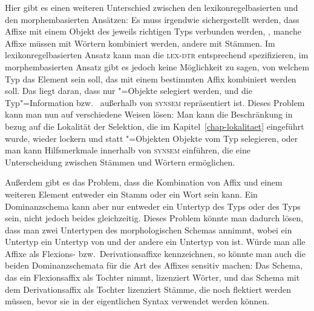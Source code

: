 Hier gibt es einen weiteren Unterschied zwischen den lexikonregelbasierten und den morphembasierten Ansätzen:
Es muss irgendwie sichergestellt werden, dass Affixe mit einem Objekt des jeweils richtigen Typs verbunden werden,
\dash, manche Affixe müssen mit Wörtern kombiniert werden, andere mit Stämmen. 
Im lexikonregelbasierten Ansatz kann
man die \textsc{lex-dtr} entsprechend spezifizieren, im morphembasierten Ansatz gibt es jedoch keine Möglichkeit
zu sagen, von welchem Typ das Element sein soll, das mit einem bestimmten Affix kombiniert werden soll. Das liegt daran,
dass nur "=Objekte selegiert werden, und die Typ"=Information  bzw.\  außerhalb
von \textsc{synsem} repräsentiert ist. Dieses Problem kann man nun auf verschiedene Weisen lösen:
Man kann die Beschränkung in bezug auf die Lokalität der Selektion, die im Kapitel~\ref{chap-lokalitaet}
eingeführt wurde, wieder lockern und statt "=Objekten Objekte vom Typ  selegieren, oder
man kann Hilfsmerkmale innerhalb von \textsc{synsem} einführen, die eine Unterscheidung zwischen Stämmen und Wörtern
ermöglichen.

Außerdem gibt es das Problem, dass die Kombination von Affix und einem weiteren Element entweder ein
Stamm oder ein Wort sein kann. Ein Dominanzschema kann aber nur entweder ein
Untertyp des Typs  oder des Typs  sein, nicht jedoch beides
gleichzeitig. Dieses Problem könnte man dadurch lösen, dass man zwei Untertypen des morphologischen
Schemas annimmt, wobei ein Untertyp ein Untertyp von  und der andere ein Untertyp von
 ist. Würde man alle Affixe als Flexions- bzw.\ Derivationsaffixe kennzeichnen, so könnte
man auch die beiden Dominanzschemata für die Art des Affixes sensitiv machen: Das Schema, das ein
Flexionsaffix als Tochter nimmt, lizenziert Wörter, und das Schema mit dem Derivationsaffix als
Tochter lizenziert Stämme, die noch flektiert werden müssen, bevor sie in der eigentlichen Syntax
verwendet werden können.





